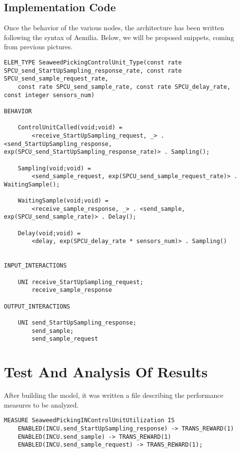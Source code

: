 \subsection{Implementation Code}

Once the behavior of the various nodes, the architecture has been written following the syntax of Aemilia. Below, we will be proposed snippets, coming from previous pictures. 

\lstset {language = C}
\bigskip
\begin{lstlisting}
ELEM_TYPE SeaweedPickingControlUnit_Type(const rate SPCU_send_StartUpSampling_response_rate, const rate SPCU_send_sample_request_rate, 
	const rate SPCU_send_sample_rate, const rate SPCU_delay_rate, const integer sensors_num)

BEHAVIOR

	ControlUnitCalled(void;void) = 
		<receive_StartUpSampling_request, _> . <send_StartUpSampling_response, exp(SPCU_send_StartUpSampling_response_rate)> . Sampling();

	Sampling(void;void) = 
		<send_sample_request, exp(SPCU_send_sample_request_rate)> . WaitingSample();

	WaitingSample(void;void) = 
		<receive_sample_response, _> . <send_sample, exp(SPCU_send_sample_rate)> . Delay();

	Delay(void;void) =
		<delay, exp(SPCU_delay_rate * sensors_num)> . Sampling()


INPUT_INTERACTIONS

	UNI receive_StartUpSampling_request;
		receive_sample_response

OUTPUT_INTERACTIONS 

	UNI send_StartUpSampling_response;
		send_sample;
		send_sample_request
\end{lstlisting}

\section{Test And Analysis Of Results}

After building the model, it was written a file describing the
performance measures to be analyzed. 

\lstset {language = C}
\bigskip
\begin{lstlisting}
MEASURE SeaweedPickingINControlUnitUtilization IS
	ENABLED(INCU.send_StartUpSampling_response) -> TRANS_REWARD(1)
	ENABLED(INCU.send_sample) -> TRANS_REWARD(1)
	ENABLED(INCU.send_sample_request) -> TRANS_REWARD(1);
\end{lstlisting}

